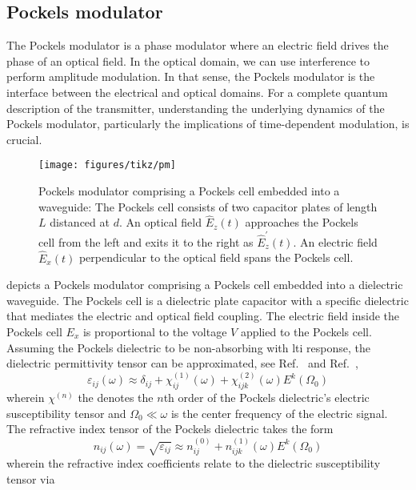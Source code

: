 \FloatBarrier
\subsection{Pockels modulator}

The Pockels modulator is a phase modulator where an electric field drives the phase of an optical field.
In the optical domain, we can use interference to perform amplitude modulation.
In that sense, the Pockels modulator is the interface between the electrical and optical domains.
For a complete quantum description of the transmitter, understanding the underlying dynamics of the Pockels modulator, particularly the implications of time-dependent modulation, is crucial.

\begin{figure}[htb]
    \centering
    \texttt{[image: figures/tikz/pm]}
    \caption{Pockels modulator comprising a Pockels cell embedded into a waveguide: The Pockels cell consists of two capacitor plates of length $L$ distanced at $d$. An optical field $\hat{E}_z(t)$ approaches the Pockels cell from the left and exits it to the right as $\hat{E}_z^\prime(t)$. An electric field $\hat{E}_x(t)$ perpendicular to the optical field spans the Pockels cell.}\label{fig:pm}
\end{figure}
 depicts a Pockels modulator comprising a Pockels cell embedded into a dielectric waveguide.
The Pockels cell is a dielectric plate capacitor with a specific dielectric that mediates the electric and optical field coupling.
The electric field inside the Pockels cell $E_x$ is proportional to the voltage $V$ applied to the Pockels cell.
Assuming the Pockels dielectric to be non-absorbing with \gls{lti} response, the dielectric permittivity tensor can be approximated, see Ref.~\cite{Murti2014} and Ref.~\cite[p.~1070]{Mandel1995},
\begin{equation}
	\varepsilon_{ij}(\omega)
	\approx
	\delta_{ij}
	+
	\chi_{ij}^{(1)}(\omega)
	+
	\chi_{ijk}^{(2)}(\omega)
	E^k(\Omega_0)
\end{equation}
wherein $\chi^{(n)}$ the denotes the $n$th order of the Pockels dielectric's electric susceptibility tensor and $\Omega_0\ll\omega$ is the center frequency of the electric signal.
The refractive index tensor of the Pockels dielectric takes the form
\begin{equation}
	n_{ij}(\omega)
	=
	\sqrt{\varepsilon_{ij}}
	\approx
	n_{ij}^{(0)}
	+
	n_{ijk}^{(1)}(\omega)
	E^k(\Omega_0)
\end{equation}
wherein the refractive index coefficients relate to the dielectric susceptibility tensor via~\cite{Rerat2020}
